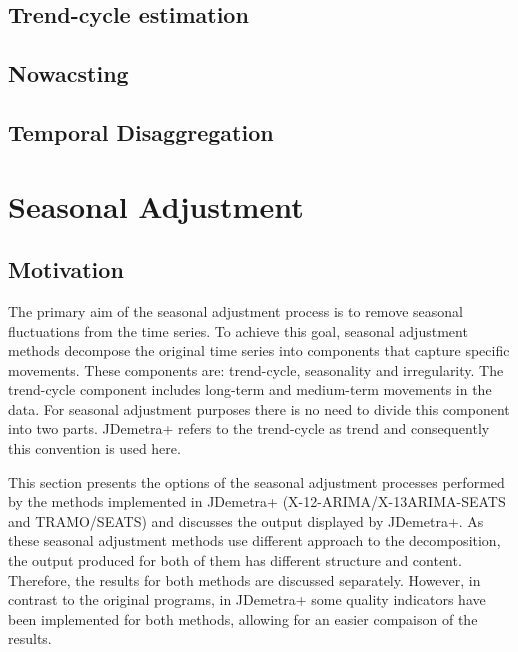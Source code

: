 \documentclass[
  letterpaper,
  DIV=11,
  numbers=noendperiod]{scrreprt}
\begin{document}
\hypertarget{trend-cycle-estimation}{%
\section{Trend-cycle estimation}\label{trend-cycle-estimation}}

\hypertarget{nowacsting}{%
\section{Nowacsting}\label{nowacsting}}

\hypertarget{temporal-disaggregation}{%
\section{Temporal Disaggregation}\label{temporal-disaggregation}}

\hypertarget{seasonal-adjustment-1}{%
\chapter{Seasonal Adjustment}\label{seasonal-adjustment-1}}

\hypertarget{motivation}{%
\section{Motivation}\label{motivation}}

The primary aim of the seasonal adjustment process is to remove seasonal
fluctuations from the time series. To achieve this goal, seasonal
adjustment methods decompose the original time series into components
that capture specific movements. These components are: trend-cycle,
seasonality and irregularity. The trend-cycle component includes
long-term and medium-term movements in the data. For seasonal adjustment
purposes there is no need to divide this component into two parts.
JDemetra+ refers to the trend-cycle as trend and consequently this
convention is used here.

This section presents the options of the seasonal adjustment processes
performed by the methods implemented in JDemetra+
(X-12-ARIMA/X-13ARIMA-SEATS and TRAMO/SEATS) and discusses the output
displayed by JDemetra+. As these seasonal adjustment methods use
different approach to the decomposition, the output produced for both of
them has different structure and content. Therefore, the results for
both methods are discussed separately. However, in contrast to the
original programs, in JDemetra+ some quality indicators have been
implemented for both methods, allowing for an easier compaison of the
results.
\end{document}
